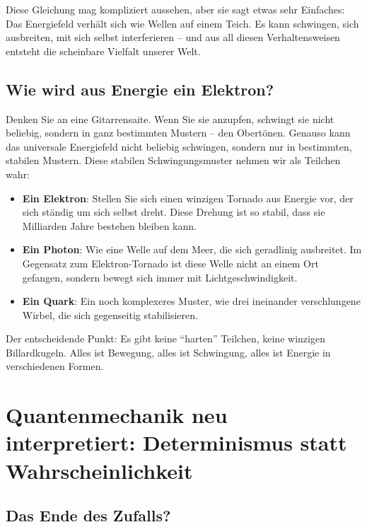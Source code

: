 	Diese Gleichung mag kompliziert aussehen, aber sie sagt etwas sehr Einfaches: Das Energiefeld verhält sich wie Wellen auf einem Teich. Es kann schwingen, sich ausbreiten, mit sich selbst interferieren -- und aus all diesen Verhaltensweisen entsteht die scheinbare Vielfalt unserer Welt.
	
	\subsection{Wie wird aus Energie ein Elektron?}
	
	Denken Sie an eine Gitarrensaite. Wenn Sie sie anzupfen, schwingt sie nicht beliebig, sondern in ganz bestimmten Mustern -- den Obertönen. Genauso kann das universale Energiefeld nicht beliebig schwingen, sondern nur in bestimmten, stabilen Mustern. Diese stabilen Schwingungsmuster nehmen wir als Teilchen wahr:
	
	\begin{itemize}
		\item \textbf{Ein Elektron}: Stellen Sie sich einen winzigen Tornado aus Energie vor, der sich ständig um sich selbst dreht. Diese Drehung ist so stabil, dass sie Milliarden Jahre bestehen bleiben kann.
		
		\item \textbf{Ein Photon}: Wie eine Welle auf dem Meer, die sich geradlinig ausbreitet. Im Gegensatz zum Elektron-Tornado ist diese Welle nicht an einem Ort gefangen, sondern bewegt sich immer mit Lichtgeschwindigkeit.
		
		\item \textbf{Ein Quark}: Ein noch komplexeres Muster, wie drei ineinander verschlungene Wirbel, die sich gegenseitig stabilisieren.
	\end{itemize}
	
	Der entscheidende Punkt: Es gibt keine ``harten'' Teilchen, keine winzigen Billardkugeln. Alles ist Bewegung, alles ist Schwingung, alles ist Energie in verschiedenen Formen.
	
	\section{Quantenmechanik neu interpretiert: Determinismus statt Wahrscheinlichkeit}
	
	\subsection{Das Ende des Zufalls?}
	
